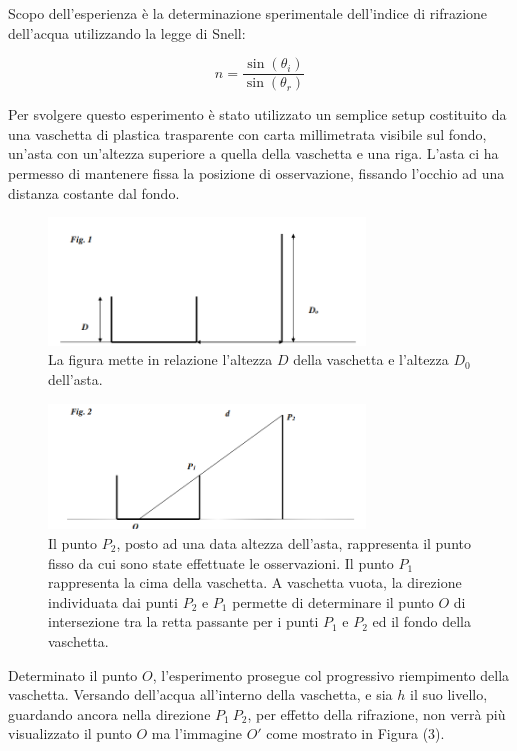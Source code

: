 Scopo dell'esperienza è la determinazione sperimentale dell'indice di rifrazione dell'acqua utilizzando la legge di Snell:

\begin{equation}
	n = \frac{\sin(\theta_i)}{\sin(\theta_r)}
\end{equation}

Per svolgere questo esperimento è stato utilizzato un semplice setup costituito da una vaschetta di plastica trasparente con carta millimetrata visibile sul fondo, un'asta con un'altezza superiore a quella della vaschetta e una riga. L'asta ci ha permesso di mantenere fissa la posizione di osservazione, fissando l'occhio ad una distanza costante dal fondo.

\begin{figure}[H]
	\centering
	\includegraphics[width=0.75\textwidth]{./figures/Im1}
	\caption{La figura mette in relazione l'altezza $D$ della vaschetta e l'altezza $D_0$ dell'asta.}
\end{figure}

\begin{figure}[H]
	\centering
	\includegraphics[width=0.75\textwidth]{./figures/Im2}
	\caption{Il punto $P_2$, posto ad una data altezza dell'asta, rappresenta il punto fisso da cui sono state effettuate le osservazioni. Il punto $P_1$ rappresenta la cima della vaschetta. A vaschetta vuota, la direzione individuata dai punti $P_2$ e $P_1$ permette di determinare il punto $O$ di intersezione tra la retta passante per i punti $P_1$ e $P_2$ ed il fondo della vaschetta.}
\end{figure}

Determinato il punto $O$, l'esperimento prosegue col progressivo riempimento della vaschetta. Versando dell'acqua all'interno della vaschetta, e sia $h$ il suo livello, guardando ancora nella direzione $P_1\ P_2$, per effetto della rifrazione, non verrà più visualizzato il punto $O$ ma l'immagine $O'$ come mostrato in Figura (3).

